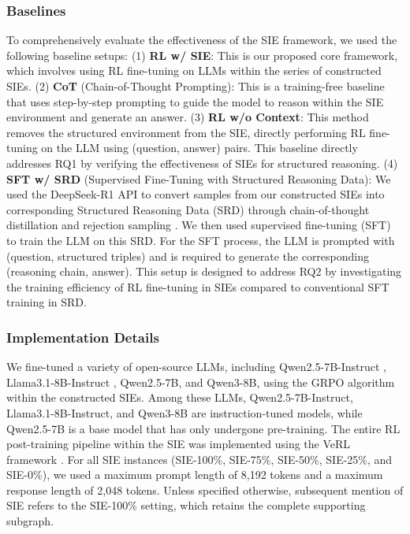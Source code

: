 \documentclass{article} %
\begin{document}
\subsubsection{Baselines}
To comprehensively evaluate the effectiveness of the SIE framework, we used the following baseline setups: (1) \textbf{RL w/ SIE}: This is our proposed core framework, which involves using RL fine-tuning on LLMs within the series of constructed SIEs. (2) \textbf{CoT} (Chain-of-Thought Prompting): This is a training-free baseline that uses step-by-step prompting to guide the model to reason within the SIE environment and generate an answer. (3) \textbf{RL w/o Context}: This method removes the structured environment from the SIE, directly performing RL fine-tuning on the LLM using (question, answer) pairs. This baseline directly addresses RQ1 by verifying the effectiveness of SIEs for structured reasoning. (4) \textbf{SFT w/ SRD} (Supervised Fine-Tuning with Structured Reasoning Data):  We used the DeepSeek-R1 API to convert samples from our constructed SIEs into corresponding Structured Reasoning Data (SRD) through chain-of-thought distillation and rejection sampling \citep{yuan2023scaling}. We then used supervised fine-tuning (SFT) to train the LLM on this SRD. For the SFT process, the LLM is prompted with (question, structured triples) and is required to generate the corresponding (reasoning chain, answer). This setup is designed to address RQ2 by investigating the training efficiency of RL fine-tuning in SIEs compared to conventional SFT training in SRD.


\subsubsection{Implementation Details}
We fine-tuned a variety of open-source LLMs, including Qwen2.5-7B-Instruct \citep{yang2025qwen3}, Llama3.1-8B-Instruct \citep{grattafiori2024llama}, Qwen2.5-7B, and Qwen3-8B, using the GRPO algorithm \citep{shao2024deepseekmath} within the constructed SIEs. Among these LLMs, Qwen2.5-7B-Instruct, Llama3.1-8B-Instruct, and Qwen3-8B are instruction-tuned models, while Qwen2.5-7B is a base model that has only undergone pre-training. 
The entire RL post-training pipeline within the SIE was implemented using the VeRL framework \citep{sheng2025hybridflow}. For all SIE instances (SIE-100\%, SIE-75\%, SIE-50\%, SIE-25\%, and SIE-0\%), we used a maximum prompt length of 8,192 tokens and a maximum response length of 2,048 tokens. Unless specified otherwise, subsequent mention of SIE refers to the SIE-100\% setting, which retains the complete supporting subgraph. 
\end{document}
